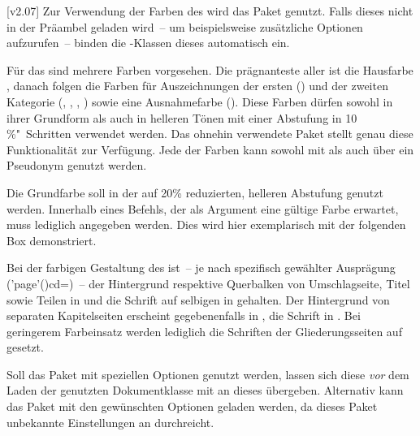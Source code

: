 \begin{DeclareEntity}{}
[v2.07]
Zur Verwendung der Farben des \CDs wird das Paket  
genutzt. Falls dieses nicht in der Präambel geladen wird~-- um beispielsweise 
zusätzliche Optionen aufzurufen~-- binden die \TUDScript-Klassen dieses 
automatisch ein.

Für das \CD sind mehrere Farben vorgesehen. Die prägnanteste aller ist die 
Hausfarbe , danach folgen die Farben für Auszeichnungen der ersten
() und der zweiten Kategorie (, , 
, ) sowie eine Ausnahmefarbe (). 
Diese Farben dürfen sowohl in ihrer Grundform als auch in helleren Tönen mit 
einer Abstufung in 10\,\%"~Schritten verwendet werden. Das ohnehin verwendete 
Paket  stellt genau diese Funktionalität zur Verfügung. Jede 
der Farben kann sowohl mit  als auch über ein Pseudonym 
 genutzt werden.
%
\begin{Example*}
Die Grundfarbe  soll in der auf 20\% reduzierten, helleren 
Abstufung genutzt werden. Innerhalb eines Befehls, der als Argument eine 
gültige Farbe erwartet, muss lediglich  angegeben werden. 
Dies wird hier exemplarisch mit der folgenden \colorbox{HKS44!20}{%
  Box %
}
demonstriert.
\end{Example*}
%
Bei der farbigen Gestaltung des \CDs ist~-- je nach spezifisch gewählter 
Ausprägung (\Option'page'(){cd=\PMisc})~-- der Hintergrund 
respektive Querbalken von Umschlagseite, Titel sowie Teilen in  
und die Schrift auf selbigen in  gehalten. Der 
Hintergrund von separaten Kapitelseiten erscheint gegebenenfalls in 
, die Schrift in . Bei geringerem 
Farbeinsatz werden lediglich die Schriften der Gliederungsseiten auf 
 gesetzt.

Soll das Paket  mit speziellen Optionen genutzt werden, lassen 
sich diese \emph{vor} dem Laden der genutzten Dokumentklasse mit 
 an dieses 
übergeben. Alternativ kann das Paket  mit den gewünschten 
Optionen geladen werden, da dieses Paket unbekannte Einstellungen an 
 durchreicht.




\end{DeclareEntity}
